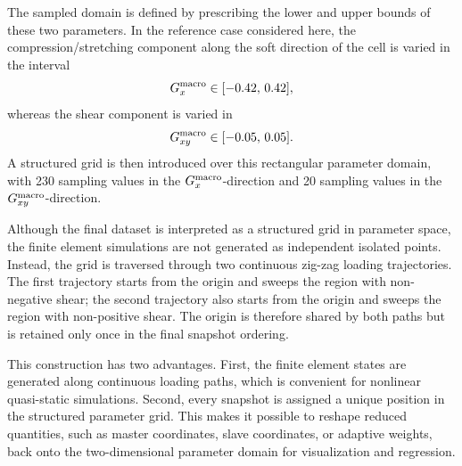 \documentclass[11pt,a4paper]{article}
\begin{document}
The sampled domain is defined by prescribing the lower and upper bounds of these
two parameters. In the reference case considered here, the compression/stretching
component along the soft direction of the cell is varied in the interval
\[
{G}^{\mathrm{macro}}_x \in [-0.42,\,0.42],
\]
whereas the shear component is varied in
\[
{G}^{\mathrm{macro}}_{xy} \in [-0.05,\,0.05].
\]
A structured grid is then introduced over this rectangular parameter domain, with
230 sampling values in the \({G}^{\mathrm{macro}}_x\)-direction and 20 sampling
values in the \({G}^{\mathrm{macro}}_{xy}\)-direction.

Although the final dataset is interpreted as a structured grid in parameter
space, the finite element simulations are not generated as independent isolated
points. Instead, the grid is traversed through two continuous zig-zag loading
trajectories. The first trajectory starts from the origin and sweeps the region
with non-negative shear; the second trajectory also starts from the origin and
sweeps the region with non-positive shear. The origin is therefore shared by
both paths but is retained only once in the final snapshot ordering.

This construction has two advantages. First, the finite element states are
generated along continuous loading paths, which is convenient for nonlinear
quasi-static simulations. Second, every snapshot is assigned a unique position in
the structured parameter grid. This makes it possible to reshape reduced
quantities, such as master coordinates, slave coordinates, or adaptive weights,
back onto the two-dimensional parameter domain for visualization and regression.

\end{document}
